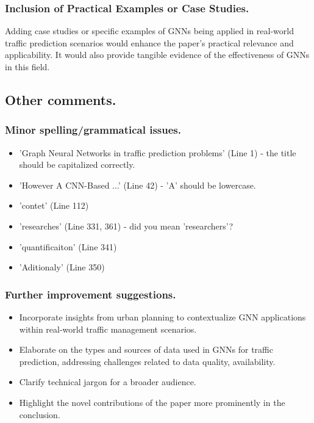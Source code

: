 \documentclass[12pt]{article}
\begin{document}
\subsubsection*{Inclusion of Practical Examples or Case Studies.}
Adding case studies or specific examples of GNNs being applied in real-world traffic prediction scenarios would enhance the paper's practical relevance 
and applicability. It would also provide tangible evidence of the effectiveness of GNNs in this field.

\subsection*{Other comments.}
\subsubsection*{Minor spelling/grammatical issues.}
\begin{itemize}
    \item 'Graph Neural Networks in traffic prediction problems' (Line 1) - the title should be capitalized correctly.
    \item 'However A CNN-Based ...' (Line 42) - 'A' should be lowercase.
    \item 'contet' (Line 112) 
    \item 'researches' (Line 331, 361) - did you mean 'researchers'?
    \item 'quantificaiton' (Line 341)
    \item 'Aditionaly' (Line 350)
\end{itemize}

\subsubsection*{Further improvement suggestions.}
\begin{itemize}
    \item Incorporate insights from urban planning to contextualize GNN applications within real-world traffic management scenarios.
    \item Elaborate on the types and sources of data used in GNNs for traffic prediction, addressing challenges related to data quality, availability.
    \item Clarify technical jargon for a broader audience.
    \item Highlight the novel contributions of the paper more prominently in the conclusion.
\end{itemize}
\end{document}
